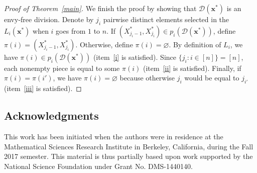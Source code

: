 \documentclass[12pt]{amsart}
\theoremstyle{definition}
\theoremstyle{remark}
\def\D{\mathcal{D}}
\def\xx{\boldsymbol{x}}
\def\blue{\color{blue}}
\begin{document}
\begin{proof}[Proof of Theorem~\ref{main}]
We finish the proof by showing that $\D(\xx^*)$ is an envy-free division.  Denote by $j_i$ pairwise distinct elements selected in the $L_i(\xx^*)$ when $i$ goes from $1$ to $n$. If $(X_{j_i-1}^*,X_{j_i}^*)\in p_i(\D(\xx^*))$, define $\pi(i)=(X_{j_i-1}^*,X_{j_i}^*)$. Otherwise, define $\pi(i)=\varnothing$. By definition of $L_i$, we have $\pi(i)\in p_i(\D(\xx^*))$ (item~\ref{i} is satisfied). Since $\{j_i\colon i\in[n]\}=[n]$, each nonempty piece is equal to some $\pi(i)$ (item~\ref{ii} is satisfied). Finally, if $\pi(i)=\pi(i')$, we have $\pi(i)=\varnothing$ because otherwise $j_i$ would be equal to $j_{i'}$ (item~\ref{iii} is satisfied). 
\end{proof}


\subsection*{Acknowledgments} This work has been initiated when the authors were in residence at the Mathematical Sciences Research Institute in Berkeley, California, during the Fall 2017 semester. This material is  thus partially based upon work supported by the National Science Foundation under Grant No. DMS-1440140.




\end{document}
